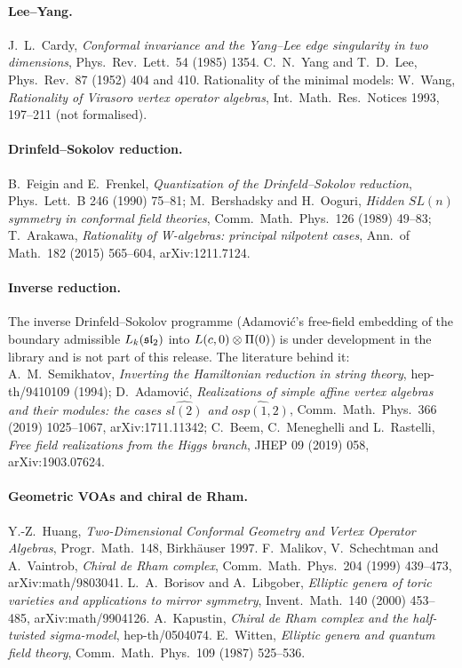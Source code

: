 \paragraph{Lee--Yang.} J.~L.~Cardy, \emph{Conformal invariance and the Yang--Lee edge singularity in two dimensions},
Phys.\ Rev.\ Lett.\ 54 (1985) 1354. C.~N.~Yang and T.~D.~Lee, Phys.\ Rev.\ 87 (1952) 404 and 410. Rationality of the
minimal models: W.~Wang, \emph{Rationality of Virasoro vertex operator algebras}, Int.\ Math.\ Res.\ Notices 1993, 197--211
(not formalised).

\paragraph{Drinfeld--Sokolov reduction.} B.~Feigin and E.~Frenkel, \emph{Quantization of the Drinfeld--Sokolov
reduction}, Phys.\ Lett.\ B 246 (1990) 75--81; M.~Bershadsky and H.~Ooguri, \emph{Hidden $SL(n)$ symmetry in conformal
field theories}, Comm.\ Math.\ Phys.\ 126 (1989) 49--83; T.~Arakawa, \emph{Rationality of W-algebras: principal nilpotent
cases}, Ann.\ of Math.\ 182 (2015) 565--604, arXiv:1211.7124.

\paragraph{Inverse reduction.} The inverse Drinfeld--Sokolov programme (Adamovi\'c's free-field embedding of the
boundary admissible $L_k(\mathfrak{sl}_2)$ into $L(c,0)\otimes\Pi(0)$) is under development in the library and is
not part of this release. The literature behind it: A.~M.~Semikhatov, \emph{Inverting the Hamiltonian reduction in
string theory}, hep-th/9410109 (1994); D.~Adamovi\'c, \emph{Realizations of simple affine vertex algebras and their
modules: the cases $\widehat{sl(2)}$ and $\widehat{osp(1,2)}$}, Comm.\ Math.\ Phys.\ 366 (2019) 1025--1067,
arXiv:1711.11342; C.~Beem, C.~Meneghelli and L.~Rastelli, \emph{Free field realizations from the Higgs branch}, JHEP 09
(2019) 058, arXiv:1903.07624.

\paragraph{Geometric VOAs and chiral de Rham.} Y.-Z.~Huang, \emph{Two-Dimensional Conformal Geometry and Vertex Operator
Algebras}, Progr.\ Math.\ 148, Birkh\"auser 1997. F.~Malikov, V.~Schechtman and A.~Vaintrob, \emph{Chiral de Rham
complex}, Comm.\ Math.\ Phys.\ 204 (1999) 439--473, arXiv:math/9803041. L.~A.~Borisov and A.~Libgober, \emph{Elliptic
genera of toric varieties and applications to mirror symmetry}, Invent.\ Math.\ 140 (2000) 453--485,
arXiv:math/9904126. A.~Kapustin, \emph{Chiral de Rham complex and the half-twisted sigma-model}, hep-th/0504074.
E.~Witten, \emph{Elliptic genera and quantum field theory}, Comm.\ Math.\ Phys.\ 109 (1987) 525--536.

\endgroup
